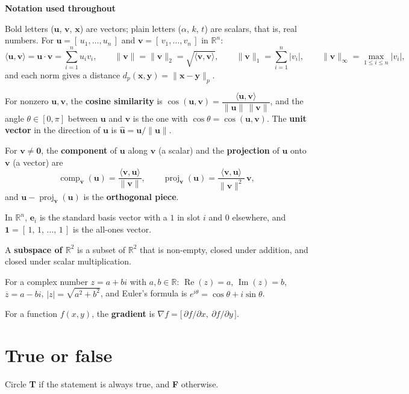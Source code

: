 \documentclass[11pt]{article}
\newenvironment{callout}[1]
  {\par\medskip\needspace{5\baselineskip}%
   \begin{lrbox}{\qcbox}%
   \begin{minipage}{\dimexpr\textwidth-2\fboxsep-4pt}%
   \setlength{\parskip}{0.4em}%
   \textbf{\sffamily\color{RoyalBlue}#1}\par}
  {\end{minipage}\end{lrbox}%
   \begin{center}\colorbox{softbg}{\usebox{\qcbox}}\end{center}\medskip}
\newcommand{\R}{\mathbb{R}}
\newcommand{\vc}[1]{\mathbf{#1}}
\newcommand{\uv}[1]{\hat{\vc{#1}}}
\newcommand{\one}{\mathbf{1}}
\newcommand{\norm}[1]{\lVert #1\rVert}
\newcommand{\ip}[2]{\langle #1,#2\rangle}
\newcommand{\proj}[2]{\operatorname{proj}_{#1}(#2)}
\newcommand{\comp}[2]{\operatorname{comp}_{#1}(#2)}
\newcommand{\conj}[1]{\overline{#1}}
\newcommand{\Rez}{\operatorname{Re}}
\newcommand{\Imz}{\operatorname{Im}}
\newcommand{\grad}{\nabla}
\begin{document}
\newpage
\begin{callout}{Notation used throughout}
Bold letters ($\vc{u}$, $\vc{v}$, $\vc{x}$) are vectors; plain letters
($\alpha$, $k$, $t$) are scalars, that is, real numbers. For
$\vc{u}=[\,u_1,\dots,u_n\,]$ and $\vc{v}=[\,v_1,\dots,v_n\,]$ in $\R^{n}$:
\[
  \ip{\vc{u}}{\vc{v}}=\vc{u}\cdot\vc{v}=\sum_{i=1}^{n}u_iv_i,
  \qquad
  \norm{\vc{v}}=\norm{\vc{v}}_2=\sqrt{\ip{\vc{v}}{\vc{v}}},
  \qquad
  \norm{\vc{v}}_1=\sum_{i=1}^{n}\lvert v_i\rvert,
  \qquad
  \norm{\vc{v}}_\infty=\max_{1\le i\le n}\lvert v_i\rvert ,
\]
and each norm gives a distance $d_p(\vc{x},\vc{y})=\norm{\vc{x}-\vc{y}}_p$.

For nonzero $\vc{u},\vc{v}$, the \textbf{cosine similarity} is
$\cos(\vc{u},\vc{v})=\dfrac{\ip{\vc{u}}{\vc{v}}}{\norm{\vc{u}}\,\norm{\vc{v}}}$,
and the angle $\theta\in[0,\pi]$ between $\vc{u}$ and $\vc{v}$ is the one with
$\cos\theta=\cos(\vc{u},\vc{v})$. The \textbf{unit vector} in the direction of
$\vc{u}$ is $\uv{u}=\vc{u}/\norm{\vc{u}}$.

For $\vc{v}\neq\vc{0}$, the \textbf{component} of $\vc{u}$ along $\vc{v}$ (a
scalar) and the \textbf{projection} of $\vc{u}$ onto $\vc{v}$ (a vector) are
\[
  \comp{\vc{v}}{\vc{u}}=\frac{\ip{\vc{v}}{\vc{u}}}{\norm{\vc{v}}},
  \qquad
  \proj{\vc{v}}{\vc{u}}=\frac{\ip{\vc{v}}{\vc{u}}}{\norm{\vc{v}}^{2}}\,\vc{v},
\]
and $\vc{u}-\proj{\vc{v}}{\vc{u}}$ is the \textbf{orthogonal piece}.

In $\R^{n}$, $\vc{e}_i$ is the standard basis vector with a $1$ in slot $i$ and
$0$ elsewhere, and $\one=[\,1,\,1,\,\dots,\,1\,]$ is the all-ones vector.

A \textbf{subspace of $\R^{2}$} is a subset of $\R^{2}$ that is non-empty, closed
under addition, and closed under scalar multiplication.

For a complex number $z=a+bi$ with $a,b\in\R$: $\Rez(z)=a$, $\Imz(z)=b$,
$\conj{z}=a-bi$, $\lvert z\rvert=\sqrt{a^{2}+b^{2}}$, and Euler's formula is
$e^{i\theta}=\cos\theta+i\sin\theta$.

For a function $f(x,y)$, the \textbf{gradient} is
$\grad f=\bigl[\,\partial f/\partial x,\ \partial f/\partial y\,\bigr]$.
\end{callout}

\newpage
\section{True or false}
Circle \textbf{T} if the statement is always true, and \textbf{F} otherwise.
\end{document}
